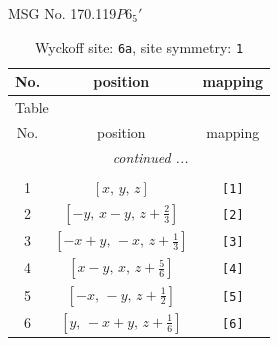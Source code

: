 \documentclass[fleqn,8pt]{jsarticle}
\begin{document}
\setcounter{MaxMatrixCols}{32}

\renewcommand{\tablename}{Table~}
\renewcommand{\figurename}{Figure~}
\begin{center}
\LARGE
MSG No. 170.119\quad$P6_{5}'$
\end{center}
\renewcommand{\arraystretch}{1.2}
\begin{longtable}{ccc}
\caption{Wyckoff site: {\tt 6a}, site symmetry: {\tt 1}}
 \\
 \hline \hline
No. & position & mapping \\ \hline \endfirsthead

\multicolumn{2}{l}{\tablename\ \thetable{}} \\
 \hline \hline
No. & position & mapping \\ \hline \endhead

 \hline \hline
\multicolumn{2}{r}{\footnotesize\it continued ...} \\ \endfoot

 \hline \hline
\multicolumn{2}{r}{} \\ \endlastfoot

1 & $\left[ x,\, y,\, z \right]$ & {\tt [1]} \\ \hline
2 & $\left[ - y,\, x - y,\, z + \frac{2}{3} \right]$ & {\tt [2]} \\ \hline
3 & $\left[ - x + y,\, - x,\, z + \frac{1}{3} \right]$ & {\tt [3]} \\ \hline
4 & $\left[ x - y,\, x,\, z + \frac{5}{6} \right]$ & {\tt [4]} \\ \hline
5 & $\left[ - x,\, - y,\, z + \frac{1}{2} \right]$ & {\tt [5]} \\ \hline
6 & $\left[ y,\, - x + y,\, z + \frac{1}{6} \right]$ & {\tt [6]} \\
\end{longtable}
\end{document}
